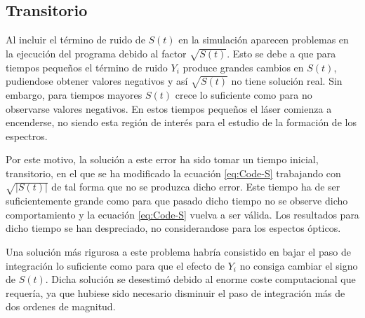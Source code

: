 
		
	\subsection{Transitorio}
		\label{Mdl:Code:Trans}

		Al incluir el t\'ermino de ruido de $S(t)$ en la simulaci\'on aparecen problemas en la ejecución del programa debido al factor $\sqrt{S(t)}$. Esto se debe a que para tiempos pequeños el término de ruido $Y_i$ produce grandes cambios en $S(t)$, pudiendose obtener valores negativos y así $\sqrt{S(t)}$ no tiene solución real. Sin embargo, para tiempos mayores $S(t)$ crece lo suficiente como para no observarse valores negativos. En estos tiempos pequeños el láser comienza a encenderse, no siendo esta región de interés para el estudio de la formación de los espectros.

		Por este motivo, la solución a este error ha sido tomar un tiempo inicial, transitorio, en el que se ha modificado la ecuación \ref{eq:Code-S} trabajando con $\sqrt{|S(t)|}$ de tal forma que no se produzca dicho error. Este tiempo ha de ser suficientemente grande como para que pasado dicho tiempo no se observe dicho comportamiento y la ecuación \ref{eq:Code-S} vuelva a ser v\'alida. Los resultados para dicho tiempo se han despreciado, no considerandose para los espectos \'opticos.

		Una soluci\'on m\'as rigurosa a este problema habr\'ia consistido en bajar el paso de integraci\'on lo suficiente como para que el efecto de $Y_i$ no consiga cambiar el signo de $S(t)$. Dicha soluci\'on se desestim\'o debido al enorme coste computacional que requer\'ia, ya que hubiese sido necesario disminuir el paso de integraci\'on m\'as de dos ordenes de magnitud.

